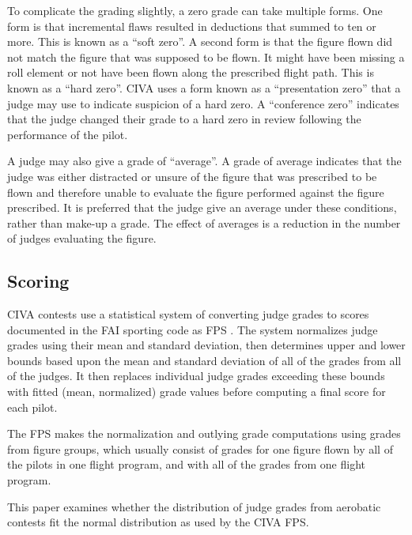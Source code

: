 To complicate the grading slightly, a zero grade can take multiple forms.
One form is that incremental flaws resulted in deductions that summed to
ten or more. This is known as a ``soft zero''. A second form is that the
figure flown did not match the figure that was supposed to be flown.
It might have been missing a roll element or not have been flown along
the prescribed flight path. This is known as a ``hard zero''. CIVA uses
a form known as a ``presentation zero'' that a judge may use to indicate
suspicion of a hard zero. A ``conference zero'' indicates that the judge
changed their grade to a hard zero in review following the performance
of the pilot.

A judge may also give a grade of ``average''. A grade of average indicates
that the judge was either distracted or unsure of the figure that was
prescribed to be flown and therefore unable to evaluate the figure performed
against the figure prescribed. It is preferred that the judge give an
average under these conditions, rather than make-up a grade.
The effect of averages is a reduction in the number of judges evaluating
the figure.

\subsection{Scoring}

CIVA contests use a statistical system of converting judge grades to scores
documented in the FAI sporting code as FPS \cite{fps}.
The system normalizes judge grades using their mean and standard deviation,
then determines upper and lower bounds based upon the mean and standard
deviation of all of the grades from all of the judges. It then replaces
individual judge grades exceeding these bounds with fitted (mean, normalized)
grade values before computing a final score for each pilot.

The FPS makes the normalization and outlying grade computations using
grades from figure groups, which usually consist of grades for
one figure flown by all of the pilots in one flight program, and with all
of the grades from one flight program.

This paper examines whether the distribution of judge grades from
aerobatic contests fit the normal distribution as used by the CIVA
FPS.
